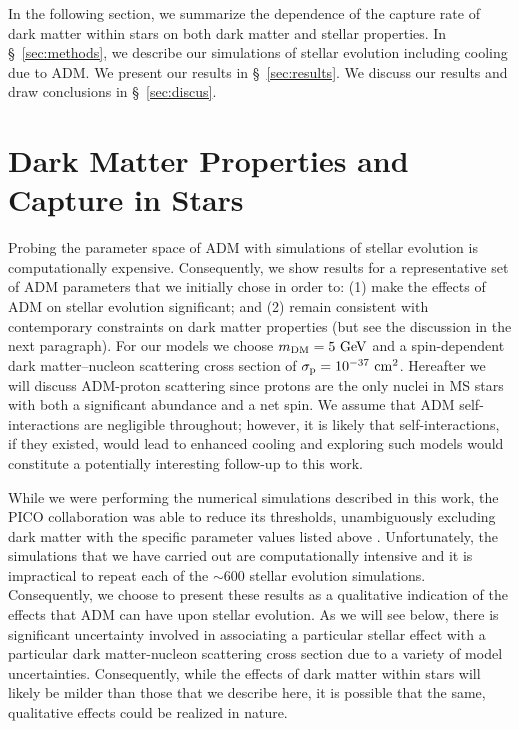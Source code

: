 \documentclass[useAMS,usenatbib]{mnras}
\begin{document}
  In the following section, we summarize the dependence of the capture rate of dark matter 
  within stars on both dark matter and stellar properties. In \S~\ref{sec:methods}, we describe
  our simulations of stellar evolution including cooling due to ADM. We present our results 
  in \S~\ref{sec:results}. We discuss our results and draw conclusions in \S~\ref{sec:discus}.


\section{Dark Matter Properties and Capture in Stars}
\label{sec:props}

  Probing the parameter space of ADM with simulations of stellar evolution is computationally expensive. 
  Consequently, we show results for a representative set of 
  ADM parameters that we initially chose in order to: 
  (1) make the effects of ADM on stellar evolution significant; 
  and (2) remain consistent with contemporary constraints on 
  dark matter properties (but see the discussion in the next 
  paragraph). For our models we choose $m_{\mathrm{DM}} = 5 \ \mathrm{GeV}$ and a 
  spin-dependent dark matter--nucleon scattering cross section of 
  $\sigma_{\mathrm{p}} = 10^{-37} \ \mathrm{cm}^2$.
  Hereafter we will discuss ADM-proton scattering since protons 
  are the only nuclei in MS stars with both 
  a significant abundance and a net spin.
  We assume that ADM self-interactions 
  are negligible throughout; however, 
  it is likely that self-interactions, if they existed, 
  would lead to enhanced cooling 
  \citep[e.g.,][]{Zentner2009High-energySun} and exploring such models 
  would constitute a potentially interesting follow-up to this work.

  While we were performing the numerical simulations described in this 
  work, the PICO collaboration was able to reduce its thresholds, 
  unambiguously excluding dark matter with the specific parameter 
  values listed above \citep{PICO}. Unfortunately, the simulations 
  that we have carried out are computationally intensive and it is 
  impractical to repeat each of the $\sim 600$ stellar evolution 
  simulations. Consequently, we choose to present these results 
  as a qualitative indication of the effects that ADM can have 
  upon stellar evolution. As we will see below, there is 
  significant uncertainty involved in associating a particular 
  stellar effect with a particular dark matter-nucleon scattering 
  cross section due to a variety of model uncertainties. 
  Consequently, while the effects of dark matter within stars 
  will likely be milder than those that we describe here, it is 
  possible that the same, qualitative effects could be realized 
  in nature.
\end{document}
